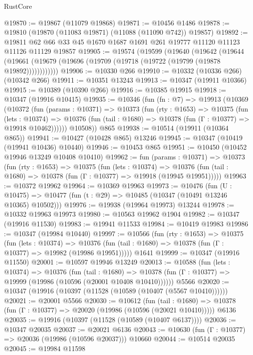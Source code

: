 \begin{lexlean}{RustCore}
\begin{coremodule}
@19870 := @19867 (@11079 @19868)
@19871 := @10456 @1486
@19878 := @19810 (@19870 (@11083 @19871) (@11088 (@11090 @742)) @19857)
@19892 := @19811 @62 @66 @33 @45 @1670 @1687 @1691 @261 @19777 @11120 @11123 @11126 @11129 @19857
@19905 := @19574
    (@19599
      (@19640
        (@19642
          (@19644 (@19661 (@19679 (@19696 (@19709 (@19718 (@19722 (@19799 (@19878 @19892))))))))))))
@19906 := @10330 @266
@19910 := @10332 (@10336 @266) (@10342 @266)
@19911 := @10351 @13243
@19913 := @10347 (@19911 @10366)
@19915 := @10389 (@10390 @266)
@19916 := @10385 @19915
@19918 := @10347 (@19916 @10415)
@19935 := @10346
    (fun (fn : @7) =>
    @19913
      (@10369
        (@10372
          (fun (params : @10371) =>
          @10373
            (fun (rty : @1653) =>
            @10375
              (fun (lets : @10374) =>
              @10376 (fun (tail : @1680) => @10378 (fun (Γ : @10377) => @19918 @10462))))))
        @10508))
    @865
@19938 := @10514 (@19911 (@10364 @865))
@19941 := @10427 (@10428 @865) @13246
@19945 := @10347 (@10419 (@19941 @10436) @10440)
@19946 := @10453 @865
@19951 := @10450 (@10452 @19946 @13249 @10408 @10410)
@19962 := fun (params : @10371) =>
  @10373
    (fun (rty : @1653) =>
    @10375
      (fun (lets : @10374) =>
      @10376 (fun (tail : @1680) => @10378 (fun (Γ : @10377) => @19918 (@19945 @19951)))))
@19963 := @10372 @19962
@19964 := @10369 @19963
@19973 := @10476
    (fun (U : @10475) => @10477 (fun (t : @29) => @10485 (@10347 (@10491 @13246 @10365) @10502)))
@19976 := @19938 (@19964 @19973) @13244
@19978 := @10332 @19963 @19973
@19980 := @10563 @19962 @1904
@19982 := @10347 (@19916 @11530)
@19983 := @19941 @11533
@19984 := @10419 @19983
@19986 := @10347 (@19984 @10440)
@19997 := @10566
    (fun (rty : @1653) =>
    @10375
      (fun (lets : @10374) =>
      @10376 (fun (tail : @1680) => @10378 (fun (Γ : @10377) => @19982 (@19986 @19951)))))
    @1641
@19999 := @10347 (@19916 @11550)
@20001 := @10597 @19946 @13249
@20013 := @10588
    (fun (lets : @10374) =>
    @10376
      (fun (tail : @1680) =>
      @10378 (fun (Γ : @10377) => @19999 (@19986 (@10596 (@20001 @10408 @10410))))))
    @5566
@20020 := @10347 (@19916 (@10397 (@11528 (@10589 (@10407 (@5567 @10410))))))
@20021 := @20001 @5566
@20030 := @10612
    (fun (tail : @1680) => @10378 (fun (Γ : @10377) => @20020 (@19986 (@10596 (@20021 @10410)))))
    @6136
@20035 := @19916 (@10397 (@11528 (@10589 (@10407 @6137))))
@20036 := @10347 @20035
@20037 := @20021 @6136
@20043 := @10630 (fun (Γ : @10377) => @20036 (@19986 (@10596 @20037))) @10660
@20044 := @10514 @20035
@20045 := @19984 @11598

\end{coremodule}
\end{lexlean}
